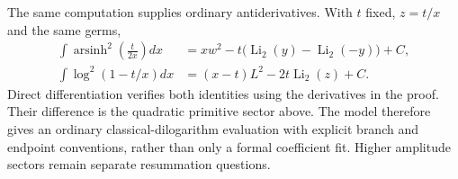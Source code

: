 The same computation supplies ordinary antiderivatives. With $t$ fixed,
$z=t/x$ and the same germs,
\begin{align}
 \int \operatorname{arsinh}^2\!\left(\frac{t}{2x}\right)dx
 &=xw^2-t\bigl(\operatorname{Li}_2(y)-\operatorname{Li}_2(-y)\bigr)+C,
                                                    \label{rmi:asinh-integral}\\
 \int \log^2(1-t/x)dx
 &=(x-t)L^2-2t\operatorname{Li}_2(z)+C.\label{rmi:log-integral}
\end{align}
Direct differentiation verifies both identities using the derivatives
in the proof. Their difference is the quadratic primitive sector above.
The model therefore gives an ordinary classical-dilogarithm evaluation
with explicit branch and endpoint conventions, rather than only a formal
coefficient fit. Higher amplitude sectors remain separate resummation
questions.
